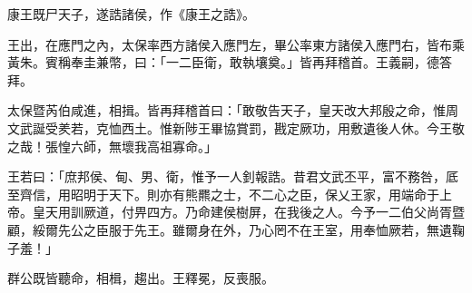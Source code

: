 
\begin{pinyinscope}
康王既尸天子，遂誥諸侯，作《康王之誥》。

王出，在應門之內，太保率西方諸侯入應門左，畢公率東方諸侯入應門右，皆布乘黃朱。賓稱奉圭兼幣，曰：「一二臣衛，敢執壤奠。」皆再拜稽首。王義嗣，德答拜。

太保暨芮伯咸進，相揖。皆再拜稽首曰：「敢敬告天子，皇天改大邦殷之命，惟周文武誕受羑若，克恤西土。惟新陟王畢協賞罰，戡定厥功，用敷遺後人休。今王敬之哉！張惶六師，無壞我高祖寡命。」

王若曰：「庶邦侯、甸、男、衛，惟予一人釗報誥。昔君文武丕平，富不務咎，厎至齊信，用昭明于天下。則亦有熊羆之士，不二心之臣，保乂王家，用端命于上帝。皇天用訓厥道，付畀四方。乃命建侯樹屏，在我後之人。今予一二伯父尚胥暨顧，綏爾先公之臣服于先王。雖爾身在外，乃心罔不在王室，用奉恤厥若，無遺鞠子羞！」

群公既皆聽命，相楫，趨出。王釋冕，反喪服。


\end{pinyinscope}
